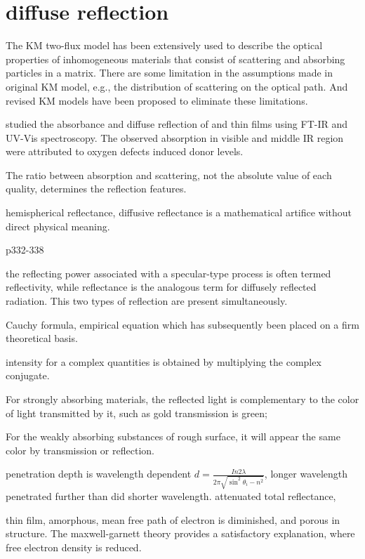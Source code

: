 \section{diffuse reflection}

The KM two-flux model has been extensively used to describe the optical properties of inhomogeneous materials that consist of scattering and absorbing particles in a matrix.\cite{Vargas1997} There are some limitation in the assumptions made in original KM model, e.g., the distribution of scattering on the optical path. And revised KM models have been proposed to eliminate these limitations.\cite{Yang2004}  

\citeauthor{Morandi2005} studied the absorbance and diffuse reflection of  and  thin films using FT-IR and UV-Vis spectroscopy. The observed absorption in visible and middle IR region were attributed to oxygen defects induced donor levels.\cite{Morandi2005}

The ratio between absorption and scattering, not the absolute value of each quality, determines the reflection features.


\iffalse

hemispherical reflectance, 
diffusive reflectance is a mathematical artifice without direct physical meaning. 

p332-338

the reflecting power associated with a specular-type process is often termed reflectivity, while reflectance is the analogous term for diffusely reflected radiation. This two types of reflection are present simultaneously. 

Cauchy formula, empirical equation which has subsequently been placed on a firm theoretical basis. 

intensity for a complex quantities is obtained by multiplying the complex conjugate. 

For strongly absorbing materials, the reflected light is complementary to the color of light transmitted by it, such as gold transmission is green; 

For the weakly absorbing substances of rough surface, it will appear the same color by transmission or reflection. 

penetration depth is wavelength dependent $d = \frac{In2 \lambda}{2\pi \sqrt{\sin^2\theta_i - n^2}}$, longer wavelength penetrated further than did shorter wavelength. attenuated total reflectance, 

thin film, amorphous, mean free path of electron is diminished, and porous in structure. The maxwell-garnett theory provides a satisfactory explanation, where free electron density is reduced. 

